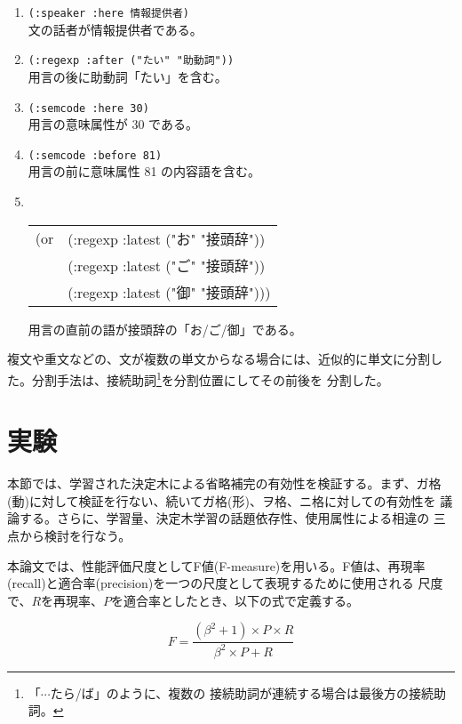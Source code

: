 \begin{enumerate}
\item{\tt (:speaker :here 情報提供者)}\\
文の話者が情報提供者である。

\item{\tt (:regexp  :after ("たい" "助動詞"))}\\
用言の後に助動詞「たい」を含む。

\item{\tt (:semcode :here 30)}\\
用言の意味属性が 30 である。

\item{\tt (:semcode :before 81)}\\
用言の前に意味属性 81 の内容語を含む。

\item{\tt 
        \begin{tabular}[t]{@{}ll}
        (or & (:regexp :latest ("お" "接頭辞"))\\
            & (:regexp :latest ("ご" "接頭辞"))\\
            & (:regexp :latest ("御" "接頭辞")))\\[2mm]
        \end{tabular}
}

用言の直前の語が接頭辞の「お/ご/御」である。

\end{enumerate}

複文や重文などの、文が複数の単文からなる場合には、近似的に単文に分割し
た。分割手法は、接続助詞\footnote{「$\cdots$たら/ば」のように、複数の
接続助詞が連続する場合は最後方の接続助詞。}を分割位置にしてその前後を
分割した。


\section{実験}
\label{節:実験}

本節では、学習された決定木による省略補完の有効性を検証する。まず、ガ格
(動)に対して検証を行ない、続いてガ格(形)、ヲ格、ニ格に対しての有効性を
議論する。さらに、学習量、決定木学習の話題依存性、使用属性による相違の
三点から検討を行なう。

本論文では、性能評価尺度としてF値(F-measure)を用いる。F値は、再現率
(recall)と適合率(precision)を一つの尺度として表現するために使用される
尺度で、$R$を再現率、$P$を適合率としたとき、以下の式で定義する。

\begin{equation}
F = \frac{(\beta^2 + 1) \times P \times R}{\beta^2 \times P + R}
\end{equation}

